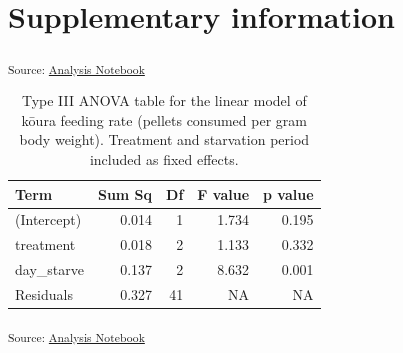 \documentclass[
  letterpaper,
  DIV=11,
  numbers=noendperiod]{scrartcl}
\begin{document}
\section*{Supplementary information}\label{supplementary-information}

\begin{table}

\caption{\label{tbl-s1-refuge-prop}Proportion of kōura observations
recorded in refuge across experimental treatments (catfish, eel,
control), light conditions (light, dark), and periods (before, during,
and after predator exposure). Combined rows summarise across all levels
of a given factor. Values represent the proportion of total observations
where kōura were located in the refuge.}


\end{table}%

\textsubscript{Source:
\href{https://OlivierRaven.github.io/https---github.com-OlivierRaven-NCE_Koura_catfish/analysis-preview.html\#cell-tbl-s1-refuge-prop}{Analysis
Notebook}}

{

\begin{longtable}[]{@{}lrrrr@{}}

\caption{\label{tbl-s2-feeding-anova}Type III ANOVA table for the linear
model of kōura feeding rate (pellets consumed per gram body weight).
Treatment and starvation period included as fixed effects.}

\tabularnewline

\toprule\noalign{}
Term & Sum Sq & Df & F value & p value \\
\midrule\noalign{}
\endhead
\bottomrule\noalign{}
\endlastfoot
(Intercept) & 0.014 & 1 & 1.734 & 0.195 \\
treatment & 0.018 & 2 & 1.133 & 0.332 \\
day\_starve & 0.137 & 2 & 8.632 & 0.001 \\
Residuals & 0.327 & 41 & NA & NA \\

\end{longtable}

}

\textsubscript{Source:
\href{https://OlivierRaven.github.io/https---github.com-OlivierRaven-NCE_Koura_catfish/analysis-preview.html\#cell-tbl-s2-feeding-anova}{Analysis
Notebook}}
\end{document}
